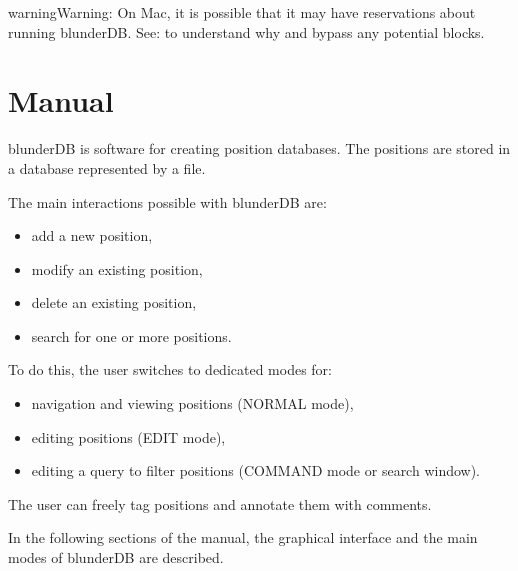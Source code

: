 \documentclass[letterpaper,10pt,english]{sphinxmanual}
\begin{document}
\begin{sphinxadmonition}{warning}{Warning:}
\sphinxAtStartPar
On Mac, it is possible that it may have reservations about running blunderDB. See:  to understand why and bypass any potential blocks.
\end{sphinxadmonition}

\sphinxstepscope


\section{Manual}
\label{\detokenize{manuel:manuel}}\label{\detokenize{manuel:id1}}\label{\detokenize{manuel::doc}}
\sphinxAtStartPar
blunderDB is software for creating position databases. The positions are stored in a database represented by a  file.

\sphinxAtStartPar
The main interactions possible with blunderDB are:
\begin{itemize}
\item {} 
\sphinxAtStartPar
add a new position,

\item {} 
\sphinxAtStartPar
modify an existing position,

\item {} 
\sphinxAtStartPar
delete an existing position,

\item {} 
\sphinxAtStartPar
search for one or more positions.

\end{itemize}

\sphinxAtStartPar
To do this, the user switches to dedicated modes for:
\begin{itemize}
\item {} 
\sphinxAtStartPar
navigation and viewing positions (NORMAL mode),

\item {} 
\sphinxAtStartPar
editing positions (EDIT mode),

\item {} 
\sphinxAtStartPar
editing a query to filter positions (COMMAND mode or search window).

\end{itemize}

\sphinxAtStartPar
The user can freely tag positions and annotate them with comments.

\sphinxAtStartPar
In the following sections of the manual, the graphical interface and the main modes of blunderDB are described.
\end{document}
